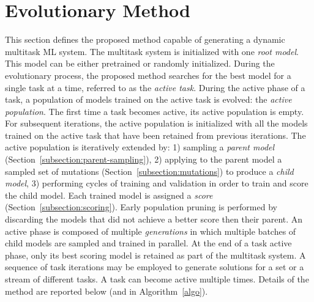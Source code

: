 \documentclass{article} \usepackage{iclr2023_conference,times}
\begin{document}
\section{Evolutionary Method}
\label{section:method}
This section defines the proposed 
method capable of generating a dynamic multitask ML system.
The multitask system is initialized with one \emph{root model}.
This model can be either pretrained or randomly initialized.
During the evolutionary process, the proposed method searches for the best model for a single task at a time,
referred to as the \emph{active task}.
During the active phase of a task, a population of models trained on the active task is evolved: the \emph{active population}.
The first time a task becomes active, its active population is empty.
For subsequent iterations, the active population is initialized with all the models trained on the active task that have been retained from previous iterations.
The active population is iteratively extended by:
1) sampling a \emph{parent model} (Section~\ref{subsection:parent-sampling}),
2) applying to the parent model a sampled set of mutations (Section~\ref{subsection:mutations}) to produce a \emph{child model},
3) performing cycles of training and validation in order to train and score the child model.
Each trained model is assigned a \emph{score} (Section~\ref{subsection:scoring}).
Early population pruning is performed by discarding the models that did not achieve a better score then their parent.
An active phase is composed of multiple \emph{generations} in which multiple batches of child models are sampled and trained in parallel.
At the end of a task active phase, only its best scoring model is retained as part of the multitask system.
A sequence of task iterations may be employed to generate solutions for a set or a stream of different tasks.
A task can become active multiple times. Details of the method are reported below (and in Algorithm~\ref{algo}).
\end{document}
